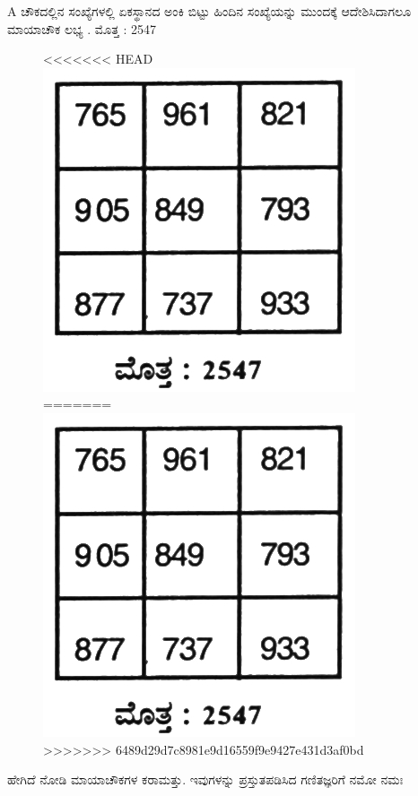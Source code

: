 A ಚೌಕದಲ್ಲಿನ ಸಂಖ್ಯೆಗಳಲ್ಲಿ ಏಕಸ್ಥಾನದ ಅಂಕಿ ಬಿಟ್ಟು ಹಿಂದಿನ ಸಂಖ್ಯೆಯನ್ನು ಮುಂದಕ್ಕೆ ಆದೇಶಿಸಿದಾಗಲೂ ಮಾಯಾಚೌಕ ಲಭ್ಯ . ಮೊತ್ತ : 2547
\begin{figure}[H]
<<<<<<< HEAD
\includegraphics{src/figures/chap7/fig7-15.jpg}
=======
\includegraphics[scale=0.85]{src/figures/chap7/fig7.15.jpg}
>>>>>>> 6489d29d7c8981e9d16559f9e9427e431d3af0bd
\end{figure}

ಹೇಗಿದೆ ನೋಡಿ ಮಾಯಾಚೌಕಗಳ ಕರಾಮತ್ತು. ಇವುಗಳನ್ನು ಪ್ರಸ್ತುತಪಡಿಸಿದ ಗಣಿತಜ್ಞರಿಗೆ ನಮೋ ನಮಃ

